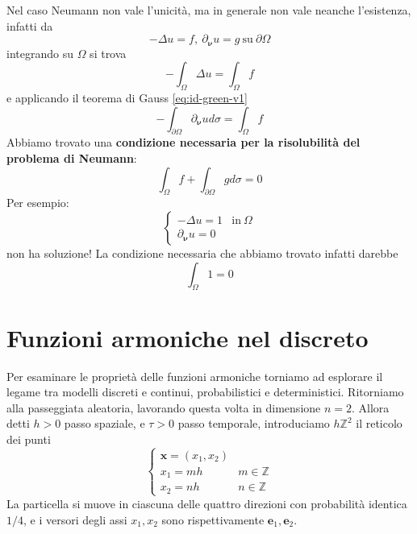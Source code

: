 \documentclass[10pt,a4paper,twoside,openright]{book}
\newcommand{\x}{\mathbf{x}}
\begin{document}
Nel caso Neumann non vale l'unicità, ma in generale non vale neanche l'esistenza, infatti da 
\begin{equation*}
	-\Delta u=f,\ \partial _{\bm{\nu}} u=g\ \text{su} \ \partial \Omega 
\end{equation*}
integrando su $\displaystyle \Omega $ si trova
\begin{equation*}
	-\int _{\Omega } \Delta u=\int _{\Omega } f
\end{equation*}
e applicando il teorema di Gauss \eqref{eq:id-green-v1}
\begin{equation*}
-\int _{\partial \Omega } \partial_{\bm{\nu}} ud\sigma =\int _{\Omega } f
\end{equation*}
Abbiamo trovato una \textbf{condizione necessaria per la risolubilità del problema di Neumann}:
\begin{equation}
\boxed{\int _{\Omega } f+\int _{\partial \Omega } gd\sigma =0}
\end{equation}
Per esempio:
\begin{equation*}
	\begin{cases}
		-\Delta u=1          & \text{in} \ \Omega \\
		\partial _{\bm{\nu}} u=0 &                    
	\end{cases}
\end{equation*}
non ha soluzione! La condizione necessaria che abbiamo trovato infatti darebbe
\begin{equation*}
	\int _{\Omega } 1=0
\end{equation*}
\section{Funzioni armoniche nel discreto}

Per esaminare le proprietà delle funzioni armoniche torniamo ad esplorare il legame tra modelli discreti e continui, probabilistici e deterministici. Ritorniamo alla passeggiata aleatoria, lavorando questa volta in dimensione $\displaystyle n=2$. Allora detti $\displaystyle h >0$ passo spaziale, e $\displaystyle \tau  >0$ passo temporale, introduciamo $\displaystyle h\mathbb{Z}^{2}$ il reticolo dei punti 
\begin{equation*}
	\begin{cases}
		\x=(x_{1},x_{2}) &                 \\
		x_{1} =mh         & m\in \mathbb{Z} \\
		x_{2} =nh         & n\in \mathbb{Z} 
	\end{cases}
\end{equation*}
La particella si muove in ciascuna delle quattro direzioni con probabilità identica $\displaystyle 1/4$, e i versori degli assi $\displaystyle x_{1},x_{2}$ sono rispettivamente $\displaystyle \mathbf{e}_{1},\mathbf{e}_{2}$.
\end{document}
